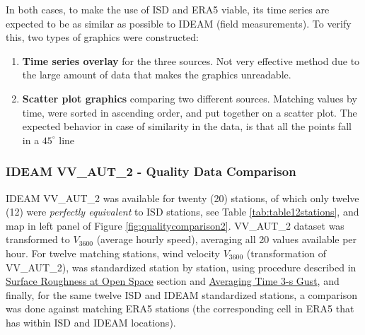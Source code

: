 \documentclass[12pt,oneside]{reedthesis}
\begin{document}
In both cases, to make the use of ISD and ERA5 viable, its time series are expected to be as similar as possible to IDEAM (field measurements). To verify this, two types of graphics were constructed:
\begin{enumerate}
\def\labelenumi{\arabic{enumi}.}
\item
  \textbf{Time series overlay} for the three sources. Not very effective method due to the large amount of data that makes the graphics unreadable.
\item
  \textbf{Scatter plot graphics} comparing two different sources. Matching values by time, were sorted in ascending order, and put together on a scatter plot. The expected behavior in case of similarity in the data, is that all the points fall in a \(45^\circ\) line
\end{enumerate}
\hypertarget{ideam-vv_aut_2---quality-data-comparison}{%
\subsubsection{IDEAM VV\_AUT\_2 - Quality Data Comparison}\label{ideam-vv_aut_2---quality-data-comparison}}

IDEAM VV\_AUT\_2 was available for twenty (20) stations, of which only twelve (12) were \emph{perfectly equivalent} to ISD stations, see Table \ref{tab:table12stations}, and map in left panel of Figure \ref{fig:qualitycomparison2}. VV\_AUT\_2 dataset was transformed to \(V_{3600}\) (average hourly speed), averaging all 20 values available per hour. For twelve matching stations, wind velocity \(V_{3600}\) (transformation of VV\_AUT\_2), was standardized station by station, using procedure described in \protect\hyperlink{rmd-roughness}{Surface Roughness at Open Space} section and \protect\hyperlink{rmd-gust}{Averaging Time 3-s Gust}, and finally, for the same twelve ISD and IDEAM standardized stations, a comparison was done against matching ERA5 stations (the corresponding cell in ERA5 that has within ISD and IDEAM locations).
\end{document}
